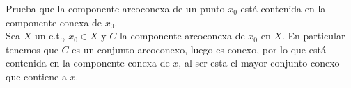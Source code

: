 \begin{ejercicio}
   

    
\end{ejercicio}

\begin{ejercicio}
    Prueba que la componente arcoconexa de un punto $x_0$ está contenida en la componente conexa de $x_0$.\\

    \noindent
    Sea $X$ un e.t., $x_0\in X$ y $C$ la componente arcoconexa de $x_0$ en $X$. En particular tenemos que $C$ es un conjunto arcoconexo, luego es conexo, por lo que está contenida en la componente conexa de $x$, al ser esta el mayor conjunto conexo que contiene a $x$.
\end{ejercicio}

